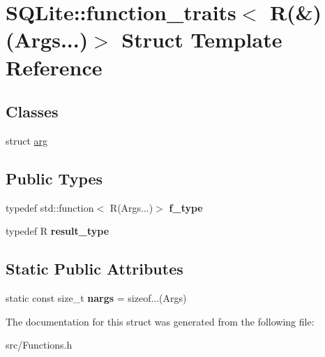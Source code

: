 \hypertarget{struct_s_q_lite_1_1function__traits_3_01_r_07_6_08_07_args_8_8_8_08_4}{\section{S\-Q\-Lite\-:\-:function\-\_\-traits$<$ R(\&)(Args...)$>$ Struct Template Reference}
\label{struct_s_q_lite_1_1function__traits_3_01_r_07_6_08_07_args_8_8_8_08_4}
}
\subsection*{Classes}
\begin{DoxyCompactItemize}
\item 
struct \hyperlink{struct_s_q_lite_1_1function__traits_3_01_r_07_6_08_07_args_8_8_8_08_4_1_1arg}{arg}
\end{DoxyCompactItemize}
\subsection*{Public Types}
\begin{DoxyCompactItemize}
\item 
\hypertarget{struct_s_q_lite_1_1function__traits_3_01_r_07_6_08_07_args_8_8_8_08_4_a3bf67e9e1ba669be8b00cec2d3b1b561}{typedef std\-::function$<$ R(Args...)$>$ {\bfseries f\-\_\-type}}\label{struct_s_q_lite_1_1function__traits_3_01_r_07_6_08_07_args_8_8_8_08_4_a3bf67e9e1ba669be8b00cec2d3b1b561}

\item 
\hypertarget{struct_s_q_lite_1_1function__traits_3_01_r_07_6_08_07_args_8_8_8_08_4_a6c7248a8112d42fb423a58b06fbae55d}{typedef R {\bfseries result\-\_\-type}}\label{struct_s_q_lite_1_1function__traits_3_01_r_07_6_08_07_args_8_8_8_08_4_a6c7248a8112d42fb423a58b06fbae55d}

\end{DoxyCompactItemize}
\subsection*{Static Public Attributes}
\begin{DoxyCompactItemize}
\item 
\hypertarget{struct_s_q_lite_1_1function__traits_3_01_r_07_6_08_07_args_8_8_8_08_4_a59d3074c935e3aadc124b83ed65a7cad}{static const size\-\_\-t {\bfseries nargs} = sizeof...(Args)}\label{struct_s_q_lite_1_1function__traits_3_01_r_07_6_08_07_args_8_8_8_08_4_a59d3074c935e3aadc124b83ed65a7cad}

\end{DoxyCompactItemize}


The documentation for this struct was generated from the following file\-:\begin{DoxyCompactItemize}
\item 
src/Functions.\-h\end{DoxyCompactItemize}
